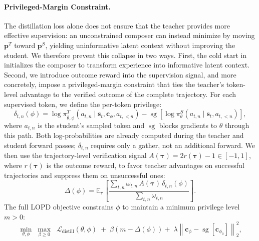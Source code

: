 \documentclass{article} %
\newcommand{\ourmethod}{{\textsc{LOPD}}\xspace}
\begin{document}
\paragraph{Privileged-Margin Constraint.} The distillation loss alone does not ensure that the teacher provides more effective supervision: an unconstrained composer can instead minimize  by moving $\boldsymbol{p}^{T}$ toward $\boldsymbol{p}^{S}$, yielding uninformative latent context without improving the student. We therefore prevent this collapse in two ways.  First, the cold start in  initializes the composer to transform experience into informative latent context. Second, we introduce outcome reward into the supervision signal, and more concretely, impose a privileged-margin constraint that ties the teacher's token-level advantage to the verified outcome of the complete trajectory. For each supervised token, we define the per-token privilege:
\begin{equation}
\delta_{t,n}(\phi)=\log\pi^{T}_{\bar{\theta},\phi}\!\left(a_{t,n}\mid \boldsymbol{s}_t,\boldsymbol{c}_{\phi},a_{t,<n}\right)-\operatorname{sg}\!\left[\log\pi^{S}_{\theta}\!\left(a_{t,n}\mid \boldsymbol{s}_t,a_{t,<n}\right)\right],
\label{eq:per-token-privilege}
\end{equation}
where $a_{t,n}$ is the student's sampled token and $\operatorname{sg}$ blocks gradients to $\theta$ through this path. Both log-probabilities are already computed during the teacher and student forward passes; $\delta_{t,n}$ requires only a gather, not an additional forward. We then use the trajectory-level verification signal $A(\boldsymbol{\tau})=2r(\boldsymbol{\tau})-1\in[-1,1]$, where $r(\boldsymbol{\tau})$ is the outcome reward, to favor teacher advantages on successful trajectories and suppress them on unsuccessful ones:
\begin{equation}
\Delta(\phi)=\mathbb{E}_{\boldsymbol{\tau}}\!\left[\frac{\sum_{t,n}\omega_{t,n}\,A(\boldsymbol{\tau})\,\delta_{t,n}(\phi)}{\sum_{t,n}\omega_{t,n}}\right].
\label{eq:privileged-margin}
\end{equation}
The full \ourmethod objective constrains $\phi$ to maintain a minimum privilege level $m>0$:
\begin{equation}
\min_{\theta,\phi}\;\max_{\beta\ge 0}\;\;\mathcal{L}_{\mathrm{distill}}(\theta,\phi)\;+\;\beta\!\left(m-\Delta(\phi)\right)+\;\lambda\left\|\boldsymbol{c}_{\phi}-\operatorname{sg}\!\left[\boldsymbol{c}_{\phi_0}\right]\right\|_2^2,
\label{eq:lopd-objective}
\end{equation}
\end{document}
